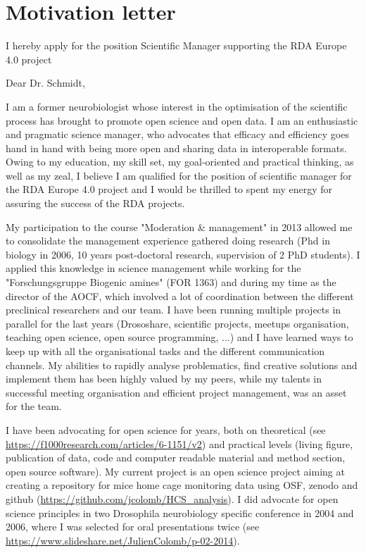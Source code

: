 \section* {Motivation letter}

I hereby apply for the position Scientific Manager supporting the RDA Europe 4.0 project
\vspace {0.1cm} 

Dear Dr. Schmidt,

I am a former neurobiologist whose interest in the optimisation of the scientific process has brought to promote open science and open data. I am an enthusiastic and pragmatic science manager, who advocates that efficacy and efficiency goes hand in hand with being more open and sharing data in interoperable formats. Owing to my education, my skill set, my goal-oriented and practical thinking, as well as my zeal, I believe I am qualified for the position of scientific manager for the RDA Europe 4.0 project and I would be thrilled to spent my energy for assuring the success of the RDA projects.


My participation to the course "Moderation \& management" in 2013 allowed me to consolidate the management experience gathered doing research (Phd in biology in 2006, 10 years post-doctoral research, supervision of 2 PhD students). I applied this knowledge in science management while  working for the 
 "Forschungsgruppe Biogenic amines" (FOR 1363) and during my time as the director of the AOCF, which involved a lot of coordination between the different preclinical researchers and our team. 
 I have been running multiple projects in parallel for the last years (Drososhare, scientific projects, meetups organisation, teaching open science, open source programming, ...) and I have learned ways to keep up with all the organisational tasks and the different communication channels.
 My abilities to rapidly analyse problematics, find creative solutions and implement them has been highly valued by my peers, while my talents in successful meeting organisation and  efficient project management, was an asset for the team. 


I have been advocating for open science for years, both on theoretical (see \url{https://f1000research.com/articles/6-1151/v2}) and  practical levels (living figure, publication of data, code and computer readable material and method section, open source software). My current project is an open science project aiming at creating a repository for mice home cage monitoring data using OSF, zenodo and github (\url{https://github.com/jcolomb/HCS_analysis}). I did advocate for open science principles in two Drosophila neurobiology specific conference in 2004 and 2006, where I was selected for oral presentations twice (see \url{https://www.slideshare.net/JulienColomb/p-02-2014}).


